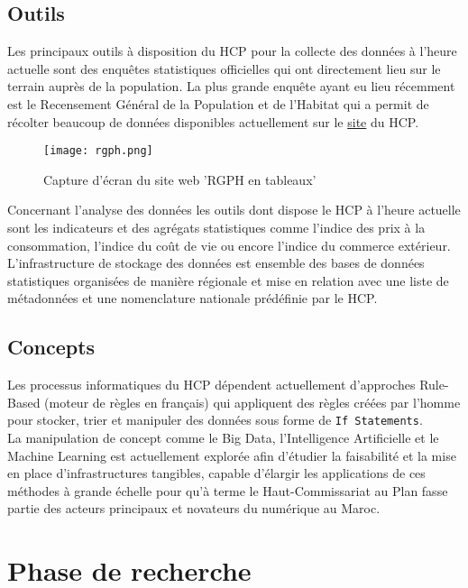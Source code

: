 \documentclass[a4paper,french,12pt]{article}
\begin{document}
\subsection{Outils}

Les principaux outils à disposition du HCP pour la collecte des données à l'heure actuelle sont des enquêtes statistiques officielles qui ont directement lieu sur le terrain auprès de la population. La plus grande enquête ayant eu lieu récemment est le Recensement Général de la Population et de l'Habitat qui a permit de récolter beaucoup de données disponibles actuellement sur le \href{http://rgphentableaux.hcp.ma}{site} du HCP.

\begin{figure}[!h]      
    \centering
    \texttt{[image: rgph.png]}
    \caption{Capture d'écran du site web 'RGPH en tableaux'}
\end{figure}

Concernant l'analyse des données les outils dont dispose le HCP à l'heure actuelle sont les indicateurs et des agrégats statistiques comme l'indice des prix à la consommation, l'indice du coût de vie ou encore l'indice du commerce extérieur.\\

L'infrastructure de stockage des données est ensemble des bases de données statistiques organisées de manière régionale et mise en relation avec une liste de métadonnées et une nomenclature nationale prédéfinie par le HCP.

\subsection{Concepts}

Les processus informatiques du HCP dépendent actuellement d'approches Rule-Based (moteur de règles en français) qui appliquent des règles créées par l'homme pour stocker, trier et manipuler des données sous forme de \verb|If Statements|.\\

La manipulation de concept comme le Big Data, l'Intelligence Artificielle et le Machine Learning est actuellement explorée afin d'étudier la faisabilité et la mise en place d'infrastructures tangibles, capable d'élargir les applications de ces méthodes à grande échelle pour qu'à terme le Haut-Commissariat au Plan fasse partie des acteurs principaux et novateurs du numérique au Maroc. 

\section{Phase de recherche}
\label{sec:Phase de recherche}
\end{document}
